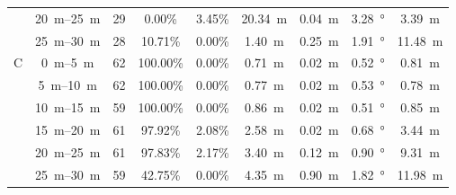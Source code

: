 \begin{table}[htbp]
{\begin{tabular}[t]{ccccccccc}
			                   & \SIrange{20}{25}{\metre} & 29              & 0.00\%         & 3.45\%         & \SI{20.34}{\metre} & \SI{0.04}{\metre} & \SI{3.28}{\degree}     & \SI{3.39}{\metre}  \\
			                   & \SIrange{25}{30}{\metre} & 28              & 10.71\%        & 0.00\%         & \SI{1.40}{\metre}  & \SI{0.25}{\metre} & \SI{1.91}{\degree}     & \SI{11.48}{\metre} \\
			\hline
			\multirow{7}{*}{C} & \SIrange{0}{5}{\metre}   & 62              & 100.00\%       & 0.00\%         & \SI{0.71}{\metre}  & \SI{0.02}{\metre} & \SI{0.52}{\degree}     & \SI{0.81}{\metre}  \\
			                   & \SIrange{5}{10}{\metre}  & 62              & 100.00\%       & 0.00\%         & \SI{0.77}{\metre}  & \SI{0.02}{\metre} & \SI{0.53}{\degree}     & \SI{0.78}{\metre}  \\
			                   & \SIrange{10}{15}{\metre} & 59              & 100.00\%       & 0.00\%         & \SI{0.86}{\metre}  & \SI{0.02}{\metre} & \SI{0.51}{\degree}     & \SI{0.85}{\metre}  \\
			                   & \SIrange{15}{20}{\metre} & 61              & 97.92\%        & 2.08\%         & \SI{2.58}{\metre}  & \SI{0.02}{\metre} & \SI{0.68}{\degree}     & \SI{3.44}{\metre}  \\
			                   & \SIrange{20}{25}{\metre} & 61              & 97.83\%        & 2.17\%         & \SI{3.40}{\metre}  & \SI{0.12}{\metre} & \SI{0.90}{\degree}     & \SI{9.31}{\metre}  \\
			                   & \SIrange{25}{30}{\metre} & 59              & 42.75\%        & 0.00\%         & \SI{4.35}{\metre}  & \SI{0.90}{\metre} & \SI{1.82}{\degree}     & \SI{11.98}{\metre} \\
			\bottomrule
		\end{tabular}
	}
\end{table}

